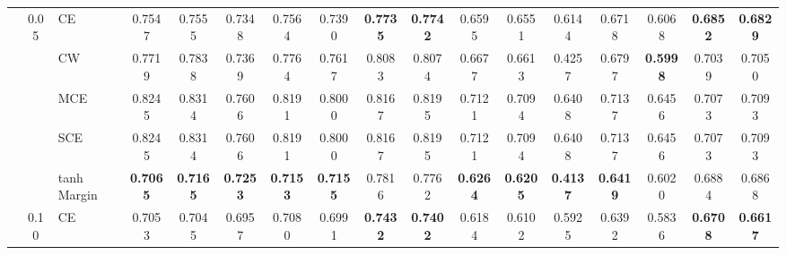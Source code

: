 \documentclass[sigconf,authordraft]{acmart}
\begin{document}
\begin{table*}
{\begin{tabular}{lcl|ccccccc|ccccccc}
    \cline{2-17}
                                 & \multirow{5}{*}{0.05} & CE &                  0.7547 &                  0.7555 &              0.7348 &                  0.7564 &           0.7390 &              \textbf{0.7735} &              \textbf{0.7742} &                  0.6595 &                  0.6551 &              0.6144 &                  0.6718 &           0.6068 &              \textbf{0.6852} &              \textbf{0.6829} \\
                                 &      & CW &                  0.7719 &                  0.7838 &              0.7369 &                  0.7764 &           0.7617 &                       0.8083 &                       0.8074 &                  0.6677 &                  0.6613 &              0.4257 &                  0.6797 &  \textbf{0.5998} &                       0.7039 &                       0.7050 \\
                                 &      & MCE &                  0.8245 &                  0.8314 &              0.7606 &                  0.8191 &           0.8000 &                       0.8167 &                       0.8195 &                  0.7121 &                  0.7094 &              0.6408 &                  0.7137 &           0.6456 &                       0.7073 &                       0.7093 \\
                                 &      & SCE &                  0.8245 &                  0.8314 &              0.7606 &                  0.8191 &           0.8000 &                       0.8167 &                       0.8195 &                  0.7121 &                  0.7094 &              0.6408 &                  0.7137 &           0.6456 &                       0.7073 &                       0.7093 \\
                                 &      & tanh Margin &         \textbf{0.7065} &         \textbf{0.7165} &     \textbf{0.7253} &         \textbf{0.7153} &  \textbf{0.7155} &                       0.7816 &                       0.7762 &         \textbf{0.6264} &         \textbf{0.6205} &     \textbf{0.4137} &         \textbf{0.6419} &           0.6020 &                       0.6884 &                       0.6868 \\
    \cline{2-17}
                                 & \multirow{5}{*}{0.10} & CE &                  0.7053 &                  0.7045 &              0.6957 &                  0.7080 &           0.6991 &              \textbf{0.7432} &              \textbf{0.7402} &                  0.6184 &                  0.6102 &              0.5925 &                  0.6392 &           0.5836 &              \textbf{0.6708} &              \textbf{0.6617} \\

\end{tabular}}
\end{table*}
\end{document}

